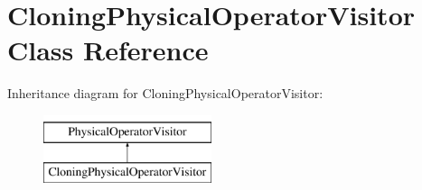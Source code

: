 \hypertarget{class_cloning_physical_operator_visitor}{\section{Cloning\+Physical\+Operator\+Visitor Class Reference}
\label{class_cloning_physical_operator_visitor}
}
Inheritance diagram for Cloning\+Physical\+Operator\+Visitor\+:\begin{figure}[H]
\begin{center}
\leavevmode
\includegraphics[height=2.000000cm]{class_cloning_physical_operator_visitor}
\end{center}
\end{figure}
